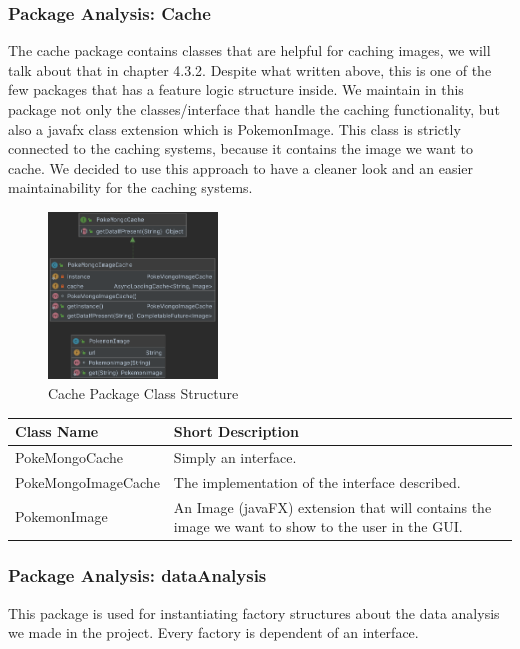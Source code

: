 \subsubsection{Package Analysis: Cache}
The cache package contains classes that are helpful for caching images, we will talk about that in chapter 4.3.2. Despite what written above, this is one of the few packages that has a feature logic structure inside. We maintain in this package not only the classes/interface that handle the caching functionality, but also a javafx class extension which is PokemonImage. This class is strictly connected to the caching systems, because it contains the image we want to cache. We decided to use this approach to have a cleaner look and an easier maintainability for the caching systems. 
\begin{figure}[H]
	\centering
	\includegraphics[width=0.4\textwidth]{img/cache_package.png}
	\caption{Cache Package Class Structure}
\end{figure}

\begin{center}
	\begin{tabular}{| m{14em} | m{19em} |} 
		\hline
		\textbf{Class Name} & \textbf{Short Description} \\ [0.5ex] 
		\hline
		PokeMongoCache & Simply an interface.\\ 
		\hline
		PokeMongoImageCache & The implementation of the interface described.\\ 
		\hline
		PokemonImage & An Image (javaFX) extension that will contains the image we want to show to the user in the GUI.\\ 
		\hline
	\end{tabular}
\end{center}

\subsubsection{Package Analysis: dataAnalysis}
This package is used for instantiating factory structures about the data analysis we made in the project. Every factory is dependent of an interface. 

